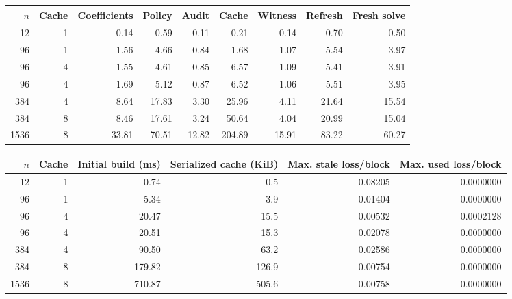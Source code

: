 \begin{center}\small
\begin{tabular}{rrrrrrrrr}\toprule
$n$ & Cache & Coefficients & Policy & Audit & Cache & Witness & Refresh & Fresh solve\\\midrule
12 & 1 & 0.14 & 0.59 & 0.11 & 0.21 & 0.14 & 0.70 & 0.50 \\
96 & 1 & 1.56 & 4.66 & 0.84 & 1.68 & 1.07 & 5.54 & 3.97 \\
96 & 4 & 1.55 & 4.61 & 0.85 & 6.57 & 1.09 & 5.41 & 3.91 \\
96 & 4 & 1.69 & 5.12 & 0.87 & 6.52 & 1.06 & 5.51 & 3.95 \\
384 & 4 & 8.64 & 17.83 & 3.30 & 25.96 & 4.11 & 21.64 & 15.54 \\
384 & 8 & 8.46 & 17.61 & 3.24 & 50.64 & 4.04 & 20.99 & 15.04 \\
1536 & 8 & 33.81 & 70.51 & 12.82 & 204.89 & 15.91 & 83.22 & 60.27 \\
\bottomrule\end{tabular}
\end{center}
\begin{center}\small
\begin{tabular}{rrrrrr}\toprule
$n$ & Cache & Initial build (ms) & Serialized cache (KiB) & Max. stale loss/block & Max. used loss/block\\\midrule
12 & 1 & 0.74 & 0.5 & 0.08205 & 0.0000000 \\
96 & 1 & 5.34 & 3.9 & 0.01404 & 0.0000000 \\
96 & 4 & 20.47 & 15.5 & 0.00532 & 0.0002128 \\
96 & 4 & 20.51 & 15.3 & 0.02078 & 0.0000000 \\
384 & 4 & 90.50 & 63.2 & 0.02586 & 0.0000000 \\
384 & 8 & 179.82 & 126.9 & 0.00754 & 0.0000000 \\
1536 & 8 & 710.87 & 505.6 & 0.00758 & 0.0000000 \\
\bottomrule\end{tabular}\end{center}

